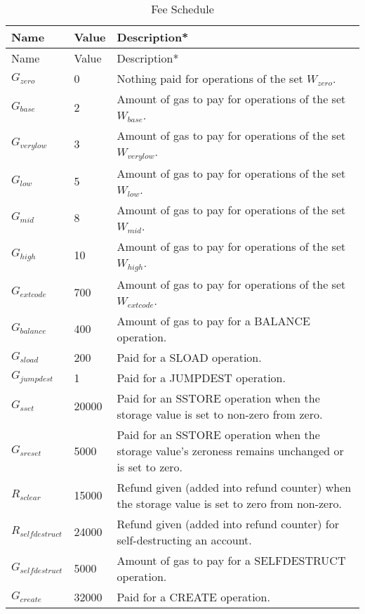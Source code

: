 \begin{center}
  \scriptsize
  \begin{longtabu} to 
  \caption{Fee Schedule\cite{ethereum-yellow}}\label{tab:gas-costs} \\
  \toprule
  Name & Value & Description* \\
  \midrule
  \endfirsthead
  \toprule
  Name & Value & Description* \\
  \midrule
  \endhead
  $G_{zero}$ & 0 & Nothing paid for operations of the set {\tiny $W_{zero}$}. \\
  $G_{base}$ & 2 & Amount of gas to pay for operations of the set {\tiny $W_{base}$}. \\
  $G_{verylow}$ & 3 & Amount of gas to pay for operations of the set {\tiny $W_{verylow}$}. \\
  $G_{low}$ & 5 & Amount of gas to pay for operations of the set {\tiny $W_{low}$}. \\
  $G_{mid}$ & 8 & Amount of gas to pay for operations of the set {\tiny $W_{mid}$}. \\
  $G_{high}$ & 10 & Amount of gas to pay for operations of the set {\tiny $W_{high}$}. \\
  $G_{extcode}$ & 700 & Amount of gas to pay for operations of the set {\tiny $W_{extcode}$}. \\
  $G_{balance}$ & 400 & Amount of gas to pay for a {\tiny BALANCE} operation. \\
  $G_{sload}$ & 200 & Paid for a {\tiny SLOAD} operation. \\
  $G_{jumpdest}$ & 1 & Paid for a {\tiny JUMPDEST} operation. \\
  $G_{sset}$ & 20000 & Paid for an {\tiny SSTORE} operation when the storage value is set to non-zero from zero. \\
  $G_{sreset}$ & 5000 & Paid for an {\tiny SSTORE} operation when the storage value's zeroness remains unchanged or is set to zero. \\
  $R_{sclear}$ & 15000 & Refund given (added into refund counter) when the storage value is set to zero from non-zero. \\
  $R_{selfdestruct}$ & 24000 & Refund given (added into refund counter) for self-destructing an account. \\
  $G_{selfdestruct}$ & 5000 & Amount of gas to pay for a {\tiny SELFDESTRUCT} operation. \\
  $G_{create}$ & 32000 & Paid for a {\tiny CREATE} operation. \\

\end{longtabu}
\end{center}
